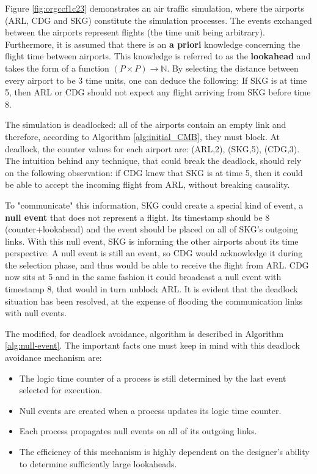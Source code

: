 \documentclass[11pt]{article}
\begin{document}
Figure \ref{fig:orgccf1c23} demonstrates an air traffic simulation, where the airports (ARL, CDG and SKG) constitute the simulation processes.
The events exchanged between the airports represent flights (the time unit being arbitrary).
Furthermore, it is assumed that there is an \textbf{a priori} knowledge concerning the flight time between airports.
This knowledge is referred to as the \textbf{lookahead} and takes the form of a function \((P \times P) \rightarrow \mathbb{N}\).
By selecting the distance between every airport to be 3 time units, one can deduce the following:
If SKG is at time 5, then ARL or CDG should not expect any flight arriving from SKG before time 8.

The simulation is deadlocked: all of the airports contain an empty link and therefore, according to Algorithm \ref{alg:initial_CMB}, they must block.
At deadlock, the counter values for each airport are: (ARL,2), (SKG,5), (CDG,3).
The intuition behind any technique, that could break the deadlock, should rely on the following observation:
if CDG knew that SKG is at time 5, then it could be able to accept the incoming flight from ARL, without breaking causality.

To "communicate" this information, SKG could create a special kind of event, a \textbf{null event} that does not represent a flight. 
Its timestamp should be 8 (counter+lookahead) and the event should be placed on all of SKG's outgoing links.
With this null event, SKG is informing the other airports about its time perspective.
A null event is still an event, so CDG would acknowledge it during the selection phase, and thus would be able to receive the flight from ARL.
CDG now sits at 5 and in the same fashion it could broadcast a null event with timestamp 8, that would in turn unblock ARL.
It is evident that the deadlock situation has been resolved, at the expense of flooding the communication links with null events.

The modified, for deadlock avoidance, algorithm is described in Algorithm \ref{alg:null-event}.
The important facts one must keep in mind with this deadlock avoidance mechanism are:
\begin{itemize}
\item The logic time counter of a process is still determined by the last event selected for execution.
\item Null events are created when a process updates its logic time counter.
\item Each process propagates null events on all of its outgoing links.
\item The efficiency of this mechanism is highly dependent on the designer's ability to determine sufficiently large lookaheads.
\end{itemize}
\end{document}
